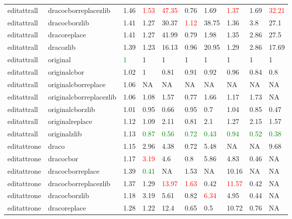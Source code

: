 \begin{landscape}
\begin{longtable}{llllllllll}
\rowcolor{lightgray}  editattrall & dracocborreplacezlib & 1.46 & \textcolor{red}{1.53} & \textcolor{red}{47.35} & 0.76 & 1.69 & \textcolor{red}{1.37} & 1.69 & \textcolor{red}{32.21}\\
\rowcolor{lightgray}  editattrall & dracocborzlib & 1.41 & 1.27 & 30.37 & \textcolor{red}{1.12} & 38.75 & 1.36 & 3.8 & 27.1\\
\rowcolor{lightgray}  editattrall & dracoreplace & 1.41 & 1.27 & 41.99 & 0.79 & 1.98 & 1.35 & 2.86 & 27.5\\
\rowcolor{lightgray}  editattrall & dracozlib & 1.39 & 1.23 & 16.13 & 0.96 & 20.95 & 1.29 & 2.86 & 17.69\\
\rowcolor{lightgray}  editattrall & original & \textcolor{green}{1} & 1 & 1 & 1 & 1 & 1 & 1 & 1\\
\rowcolor{lightgray}  editattrall & originalcbor & 1.02 & 1 & 0.81 & 0.91 & 0.92 & 0.96 & 0.84 & 0.8\\
\rowcolor{lightgray}  editattrall & originalcborreplace & 1.06 & NA & NA & NA & NA & NA & NA & NA\\
\rowcolor{lightgray}  editattrall & originalcborreplacezlib & 1.06 & 1.08 & 1.57 & 0.77 & 1.66 & 1.17 & 1.73 & NA\\
editattrall & originalcborzlib & 1.01 & 0.95 & 0.66 & 0.95 & 0.7 & 1.04 & 0.85 & 0.47\\
editattrall & originalreplace & 1.12 & 1.09 & 2.11 & 0.81 & 2.1 & 1.27 & 2.15 & 1.57\\
editattrall & originalzlib & 1.13 & \textcolor{green}{0.87} & \textcolor{green}{0.56} & \textcolor{green}{0.72} & \textcolor{green}{0.43} & \textcolor{green}{0.94} & \textcolor{green}{0.52} & \textcolor{green}{0.38}\\
editattrone & draco & 1.15 & 2.96 & 4.38 & 0.72 & 5.48 & NA & NA & 9.68\\
editattrone & dracocbor & 1.17 & \textcolor{red}{3.19} & 4.6 & 0.8 & 5.86 & 4.83 & 0.46 & NA\\
editattrone & dracocborreplace & 1.39 & \textcolor{green}{0.41} & NA & 1.53 & NA & 10.16 & NA & NA\\
editattrone & dracocborreplacezlib & 1.37 & 1.29 & \textcolor{red}{13.97} & \textcolor{red}{1.63} & 0.42 & \textcolor{red}{11.57} & 0.42 & NA\\
editattrone & dracocborzlib & 1.18 & 3.19 & 5.61 & 0.82 & \textcolor{red}{6.34} & 4.95 & 0.44 & NA\\
editattrone & dracoreplace & 1.28 & 1.22 & 12.4 & 0.65 & 0.5 & 10.72 & 0.76 & NA\\

\end{longtable}
\end{landscape}

